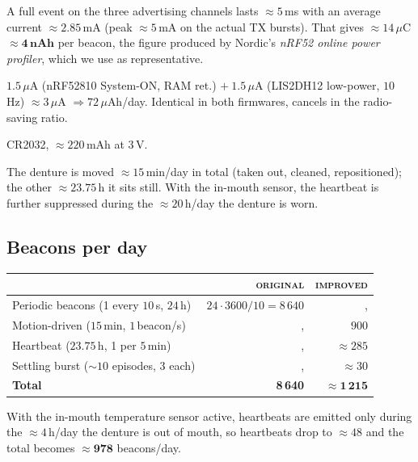 \documentclass[11pt,a4paper]{article}
\begin{document}
\begin{description}[font=\sffamily\small\bfseries\color{slate}]
\item[Charge per advertising event.]
A full event on the three advertising channels lasts $\approx 5\,$ms
with an average current $\approx 2.85\,$mA (peak $\approx 5\,$mA on
the actual TX bursts). That gives $\approx 14\,\mu$C $\approx
\mathbf{4\,\text{nAh}}$ per beacon, the figure produced by Nordic's
\emph{nRF52 online power profiler}, which we use as representative.
\item[Idle current.]
$1.5\,\mu$A (nRF52810 System-ON, RAM ret.) $+\ 1.5\,\mu$A
(LIS2DH12 low-power, $10\,$Hz) $\approx 3\,\mu$A
$\Rightarrow 72\,\mu$Ah/day. Identical in both firmwares, cancels in
the radio-saving ratio.
\item[Battery.] CR2032, $\approx 220\,$mAh at $3\,$V.
\item[Usage model.]
The denture is moved $\approx 15\,$min/day in total (taken out,
cleaned, repositioned); the other $\approx 23.75\,$h it sits still.
With the in-mouth sensor, the heartbeat is further suppressed during the
$\approx 20\,$h/day the denture is worn.
\end{description}

\subsection*{Beacons per day}

\begin{tabularx}{\linewidth}{@{} Y r r @{}}
\toprule
                                        & \textsc{original} & \textsc{improved} \\
\midrule
Periodic beacons (1 every $10\,$s, $24\,$h) & $24\cdot 3600/10 = 8\,640$ &,\\
Motion-driven ($15\,$min, $1\,$beacon/s)    &,     & $900$            \\
Heartbeat ($23.75\,$h, 1 per $5\,$min)      &,     & $\approx 285$    \\
Settling burst ($\sim 10$ episodes, 3 each) &,     & $\approx 30$     \\
\midrule
\textbf{Total}                              & \textbf{8\,640} & $\mathbf{\approx 1\,215}$ \\
\bottomrule
\end{tabularx}

\smallskip
\noindent With the in-mouth temperature sensor active, heartbeats are
emitted only during the $\approx 4\,$h/day the denture is out of
mouth, so heartbeats drop to $\approx 48$ and the total becomes
$\approx \mathbf{978}$ beacons/day.
\end{document}
